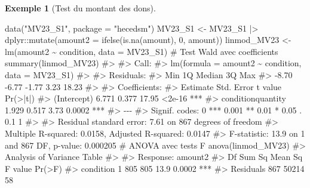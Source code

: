 \documentclass[
  11pt,
  letterpaper,
]{scrbook}
\newenvironment{Shaded}{\begin{snugshade}}{\end{snugshade}}
\newcommand{\AttributeTok}[1]{\textcolor[rgb]{0.40,0.45,0.13}{#1}}
\newcommand{\CommentTok}[1]{\textcolor[rgb]{0.37,0.37,0.37}{#1}}
\newcommand{\DecValTok}[1]{\textcolor[rgb]{0.68,0.00,0.00}{#1}}
\newcommand{\FunctionTok}[1]{\textcolor[rgb]{0.28,0.35,0.67}{#1}}
\newcommand{\NormalTok}[1]{\textcolor[rgb]{0.00,0.23,0.31}{#1}}
\newcommand{\OtherTok}[1]{\textcolor[rgb]{0.00,0.23,0.31}{#1}}
\newcommand{\SpecialCharTok}[1]{\textcolor[rgb]{0.37,0.37,0.37}{#1}}
\newcommand{\StringTok}[1]{\textcolor[rgb]{0.13,0.47,0.30}{#1}}
\theoremstyle{plain}
\theoremstyle{plain}
\theoremstyle{definition}
\newtheorem{example}{Exemple}[chapter]
\theoremstyle{definition}
\theoremstyle{remark}
\begin{document}
\begin{example}[Test du montant des
dons]
\begin{Shaded}
\begin{Highlighting}[]
\FunctionTok{data}\NormalTok{(}\StringTok{"MV23\_S1"}\NormalTok{, }\AttributeTok{package =} \StringTok{"hecedsm"}\NormalTok{)}
\NormalTok{MV23\_S1 }\OtherTok{\textless{}{-}}\NormalTok{ MV23\_S1 }\SpecialCharTok{|\textgreater{}}
\NormalTok{    dplyr}\SpecialCharTok{::}\FunctionTok{mutate}\NormalTok{(}\AttributeTok{amount2 =} \FunctionTok{ifelse}\NormalTok{(}\FunctionTok{is.na}\NormalTok{(amount), }\DecValTok{0}\NormalTok{, amount))}
\NormalTok{linmod\_MV23 }\OtherTok{\textless{}{-}} \FunctionTok{lm}\NormalTok{(amount2 }\SpecialCharTok{\textasciitilde{}}\NormalTok{ condition, }\AttributeTok{data =}\NormalTok{ MV23\_S1)}
\CommentTok{\# Test Wald avec coefficients}
\FunctionTok{summary}\NormalTok{(linmod\_MV23)}
\CommentTok{\#\textgreater{} }
\CommentTok{\#\textgreater{} Call:}
\CommentTok{\#\textgreater{} lm(formula = amount2 \textasciitilde{} condition, data = MV23\_S1)}
\CommentTok{\#\textgreater{} }
\CommentTok{\#\textgreater{} Residuals:}
\CommentTok{\#\textgreater{}    Min     1Q Median     3Q    Max }
\CommentTok{\#\textgreater{}  {-}8.70  {-}6.77  {-}1.77   3.23  18.23 }
\CommentTok{\#\textgreater{} }
\CommentTok{\#\textgreater{} Coefficients:}
\CommentTok{\#\textgreater{}                   Estimate Std. Error t value Pr(\textgreater{}|t|)    }
\CommentTok{\#\textgreater{} (Intercept)          6.771      0.377   17.95   \textless{}2e{-}16 ***}
\CommentTok{\#\textgreater{} conditionquantity    1.929      0.517    3.73   0.0002 ***}
\CommentTok{\#\textgreater{} {-}{-}{-}}
\CommentTok{\#\textgreater{} Signif. codes:  0 \textquotesingle{}***\textquotesingle{} 0.001 \textquotesingle{}**\textquotesingle{} 0.01 \textquotesingle{}*\textquotesingle{} 0.05 \textquotesingle{}.\textquotesingle{} 0.1 \textquotesingle{} \textquotesingle{} 1}
\CommentTok{\#\textgreater{} }
\CommentTok{\#\textgreater{} Residual standard error: 7.61 on 867 degrees of freedom}
\CommentTok{\#\textgreater{} Multiple R{-}squared:  0.0158, Adjusted R{-}squared:  0.0147 }
\CommentTok{\#\textgreater{} F{-}statistic: 13.9 on 1 and 867 DF,  p{-}value: 0.000205}
\CommentTok{\# ANOVA avec tests F}
\FunctionTok{anova}\NormalTok{(linmod\_MV23)}
\CommentTok{\#\textgreater{} Analysis of Variance Table}
\CommentTok{\#\textgreater{} }
\CommentTok{\#\textgreater{} Response: amount2}
\CommentTok{\#\textgreater{}            Df Sum Sq Mean Sq F value Pr(\textgreater{}F)    }
\CommentTok{\#\textgreater{} condition   1    805     805    13.9 0.0002 ***}
\CommentTok{\#\textgreater{} Residuals 867  50214      58                   }

\end{Highlighting}
\end{Shaded}
\end{example}
\end{document}
